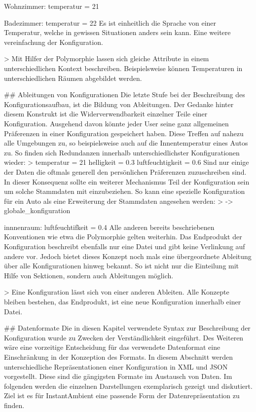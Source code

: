 	Wohnzimmer: 
		temperatur = 21
	
	Badezimmer: 
		temperatur = 22
Es ist einheitlich die Sprache von einer Temperatur, welche in gewissen Situationen anders sein kann. Eine weitere vereinfachung der Konfiguration.

> Mit Hilfer der Polymorphie lassen sich gleiche Attribute in einem unterschiedlichen Kontext beschreiben. Beispielsweise können Temperaturen in unterschiedlichen Räumen abgebildet werden.

## Ableitungen von Konfigurationen
Die letzte Stufe bei der Beschreibung des Konfigurationsaufbau, ist die Bildung von Ableitungen. Der Gedanke hinter diesem Konstrukt ist die Widerverwendbarkeit einzelner Teile einer Konfiguration. Ausgehend davon könnte jeder User seine ganz allgemeinen Präferenzen in einer Konfiguration gespeichert haben. Diese Treffen auf nahezu alle Umgebungen zu, so beispielsweise auch auf die Innentemperatur eines Autos zu. So finden sich Redundanzen innerhalb unterschiedlichster Konfigurationen wieder:
> temperatur = 21
	helligkeit = 0.3
	luftfeuchtigkeit = 0.6
Sind nur einige der Daten die oftmals generell den persönlichen Präferenzen zuzuschreiben sind. In dieser Konsequenz sollte ein weiterer Mechanismus Teil der Konfiguration sein um solche Stammdaten mit einzubeziehen. So kann eine spezielle Konfiguration für ein Auto als eine Erweiterung der Stammdaten angesehen werden:
> -> globale_konfiguration
	
	innnenraum:
		luftfeuchtifkeit = 0.4
Alle anderen bereits beschriebenen Konventionen wie etwa die Polymorphie gelten weiterhin. Das Endprodukt der Konfiguration beschreibt ebenfalls nur eine Datei und gibt keine Verlinkung auf andere vor. Jedoch bietet dieses Konzept noch mals eine übergeordnete Ableitung über alle Konfigurationen hinweg bekannt. So ist nicht nur die Einteilung mit Hilfe von Sektionen, sondern auch Ableitungen möglich. 

> Eine Konfiguration lässt sich von einer anderen Ableiten. Alle  Konzepte bleiben bestehen, das Endprodukt, ist eine neue Konfiguration innerhalb einer Datei. 

## Datenformate
Die in diesen Kapitel verwendete Syntax zur Beschreibung der Konfiguration wurde zu Zwecken der Verständlichkeit eingeführt. Des Weiteren wäre eine vorzeitige Entscheidung für das verwendete Datenformat eine Einschränkung in der Konzeption des Formats. In diesem Abschnitt werden unterschiedliche Repräsentationen einer Konfiguration in XML und JSON vorgestellt. Diese sind die gängigsten Formate im Austausch von Daten. Im folgenden werden die einzelnen Darstellungen exemplarisch gezeigt und diskutiert. Ziel ist es für InstantAmbient eine passende Form der Datenrepräsentation zu finden. 

